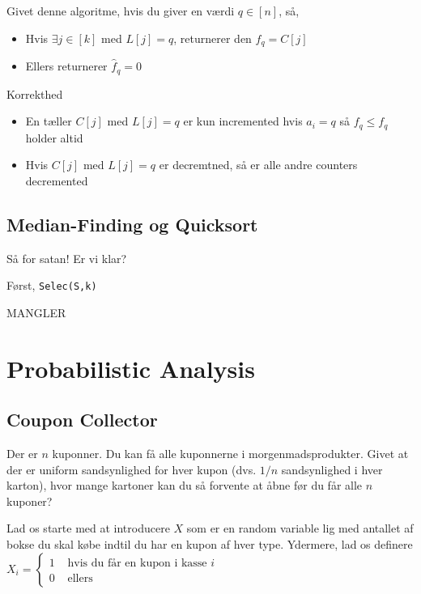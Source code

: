 \documentclass[11pt]{article}
\theoremstyle{definition}
\theoremstyle{remark}
\begin{document}
Givet denne algoritme, hvis du giver en værdi $q \in [n]$, så,
\begin{itemize}
\item Hvis $\exists j \in [k]$ med $L[j]=q$, returnerer den $\hat{f}_q = C[j]$
\item Ellers returnerer $\hat{f}_{q} = 0$
\end{itemize}

\noindent
\large Korrekthed\\
\noindent
\begin{itemize}
\item En tæller $C[j]$ med $L[j] = q$ er kun incremented hvis $a_{i} = q$ så $f_{q} \leq f_{q}$ holder altid
\item Hvis $C[j]$ med $L[j] = q$ er decremtned, så er alle andre counters decremented
\end{itemize}


\subsection{Median-Finding og Quicksort}
\label{subsec:label}

Så for satan! Er vi klar?

Først, \texttt{Selec(S,k)}

MANGLER



\newpage

\section{Probabilistic Analysis}
\label{sec:proban}

\subsection{Coupon Collector}

Der er $n$ kuponner. Du kan få alle kuponnerne i morgenmadsprodukter. Givet at der er uniform sandsynlighed for hver kupon (dvs. $1/n$ sandsynlighed i hver karton), hvor mange kartoner kan du så forvente at åbne før du får alle $n$ kuponer?

Lad os starte med at introducere $X$ som er en random variable lig med antallet af bokse du skal købe indtil du har en kupon af hver type. Ydermere, lad os definere $X_{i} = \begin{cases}
  1 & \text{ hvis du får en kupon i kasse }i\\
  0 & \text{ ellers}
\end{cases}$
\end{document}
